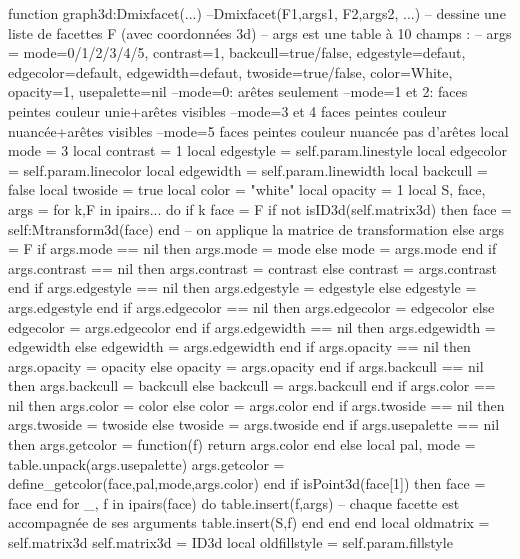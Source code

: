 \documentclass[12pt]{standalone}
\begin{document}
\begin{luacode*}
function graph3d:Dmixfacet(...) --Dmixfacet(F1,args1, F2,args2, ...)
-- dessine une liste de facettes F (avec coordonnées 3d)
-- args est une table à 10 champs :
-- args = {mode=0/1/2/3/4/5, contrast=1, backcull=true/false, edgestyle=defaut, edgecolor=default, edgewidth=defaut, twoside=true/false, color=White, opacity=1, usepalette=nil}    
    --mode=0: arêtes seulement
    --mode=1 et 2: faces peintes couleur unie+arêtes visibles
    --mode=3 et 4 faces peintes couleur nuancée+arêtes visibles
    --mode=5 faces peintes couleur nuancée pas d'arêtes
    local mode = 3
    local contrast = 1
    local edgestyle = self.param.linestyle
    local edgecolor = self.param.linecolor
    local edgewidth = self.param.linewidth
    local backcull = false
    local twoside = true
    local color = "white"
    local opacity = 1
    local S, face, args = {}
    for k,F in ipairs{...} do
        if k%
            face = F
            if not isID3d(self.matrix3d) then face = self:Mtransform3d(face) end -- on applique la matrice de transformation
        else
            args = F
            if args.mode == nil then args.mode = mode else mode = args.mode end
            if args.contrast == nil then args.contrast = contrast else contrast = args.contrast end
            if args.edgestyle == nil then args.edgestyle = edgestyle else edgestyle = args.edgestyle end
            if args.edgecolor == nil then args.edgecolor = edgecolor else edgecolor = args.edgecolor end
            if args.edgewidth == nil then args.edgewidth = edgewidth else edgewidth = args.edgewidth end
            if args.opacity == nil then args.opacity = opacity else opacity = args.opacity end
            if args.backcull == nil then args.backcull = backcull else backcull = args.backcull end
            if args.color == nil then args.color = color else color = args.color end
            if args.twoside == nil then args.twoside = twoside else twoside = args.twoside end
            if args.usepalette == nil then
                args.getcolor = function(f)
                    return args.color
                end
            else
                local pal, mode = table.unpack(args.usepalette)
                args.getcolor = define_getcolor(face,pal,mode,args.color)
            end
            if isPoint3d(face[1]) then face = {face} end
            for _, f in ipairs(face) do
                table.insert(f,args) -- chaque facette est accompagnée de ses arguments
                table.insert(S,f)
            end
        end
    end
    local oldmatrix = self.matrix3d
    self.matrix3d = ID3d
    local oldfillstyle = self.param.fillstyle

\end{luacode*}
\end{document}
